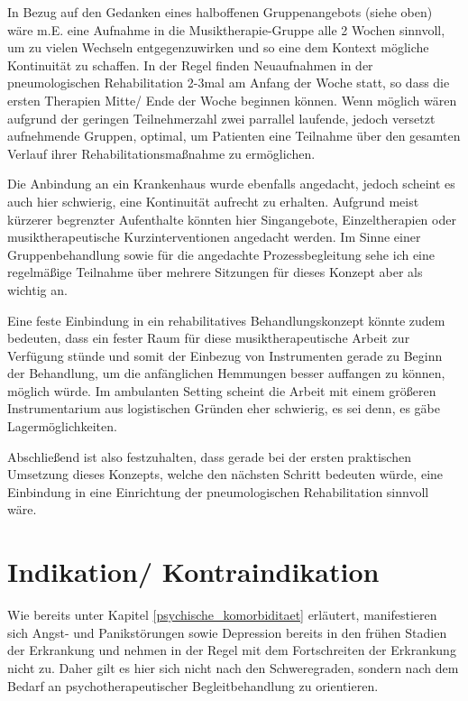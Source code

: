In Bezug auf den Gedanken eines halboffenen Gruppenangebots (siehe oben) wäre m.E. eine Aufnahme in die Musiktherapie-Gruppe alle 2 Wochen sinnvoll, um zu vielen Wechseln entgegenzuwirken und so eine dem Kontext mögliche Kontinuität zu schaffen. In der Regel finden Neuaufnahmen in der pneumologischen Rehabilitation 2-3mal am Anfang der Woche statt, so dass die ersten Therapien Mitte/ Ende der Woche beginnen können. Wenn möglich wären aufgrund der geringen Teilnehmerzahl zwei parrallel laufende, jedoch versetzt aufnehmende Gruppen, optimal, um Patienten eine Teilnahme über den gesamten Verlauf ihrer Rehabilitationsmaßnahme zu ermöglichen.

Die Anbindung an ein Krankenhaus wurde ebenfalls angedacht, jedoch scheint es auch hier schwierig, eine Kontinuität aufrecht zu erhalten. Aufgrund meist kürzerer begrenzter Aufenthalte könnten hier Singangebote, Einzeltherapien oder musiktherapeutische Kurzinterventionen angedacht werden. Im Sinne einer Gruppenbehandlung sowie für die angedachte Prozessbegleitung sehe ich eine regelmäßige Teilnahme über mehrere Sitzungen für dieses Konzept aber als wichtig an. 

Eine feste Einbindung in ein rehabilitatives Behandlungskonzept könnte zudem bedeuten, dass ein fester Raum für diese musiktherapeutische Arbeit zur Verfügung stünde und somit der Einbezug von Instrumenten gerade zu Beginn der Behandlung, um die anfänglichen Hemmungen besser auffangen zu können, möglich würde. Im ambulanten Setting scheint die Arbeit mit einem größeren Instrumentarium aus logistischen Gründen eher schwierig, es sei denn, es gäbe Lagermöglichkeiten.

Abschließend ist also festzuhalten, dass gerade bei der ersten praktischen Umsetzung dieses Konzepts, welche den nächsten Schritt bedeuten würde, eine Einbindung in eine Einrichtung der pneumologischen Rehabilitation sinnvoll wäre.

\section{Indikation/ Kontraindikation}
Wie bereits unter Kapitel \ref{psychische_komorbiditaet} erläutert, manifestieren sich Angst- und Panikstörungen sowie Depression bereits in den frühen Stadien der Erkrankung und nehmen in der Regel mit dem Fortschreiten der Erkrankung nicht zu. Daher gilt es hier sich nicht nach den Schweregraden, sondern nach dem Bedarf an psychotherapeutischer Begleitbehandlung zu orientieren. 

